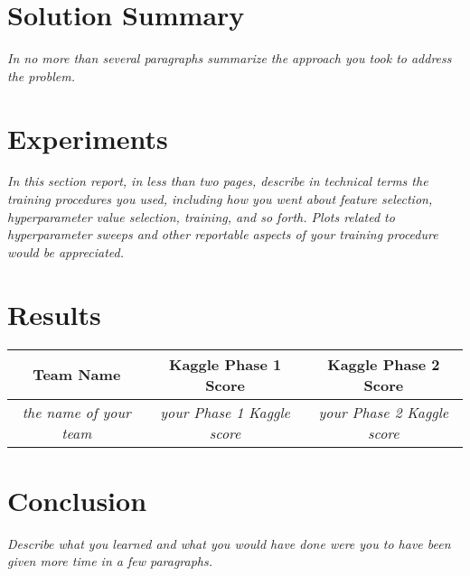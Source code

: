 \section{Solution Summary}
\emph{In no more than several paragraphs summarize the approach you took to address the problem.}
\section{Experiments}
\emph{In this section report, in less than two pages, describe in technical terms the training procedures you used, including how you went about feature selection, hyperparameter value selection, training, and so forth.  Plots related to hyperparameter sweeps and other reportable aspects of your training procedure would be appreciated.}



\section{Results}

\begin{center}
 \begin{tabular}{|c | c | c |} 
 \hline
 Team Name & Kaggle Phase 1 Score & Kaggle Phase 2 Score  \\ [0.5ex]
 \hline\hline
 \emph{the name of your team} & \emph{your Phase 1 Kaggle score}  & \emph{your Phase 2 Kaggle score}  \\
 \hline
\end{tabular}
\end{center}

\section{Conclusion}
\emph{Describe what you learned and what you would have done were you to have been given more time in a few paragraphs.}
\newpage





